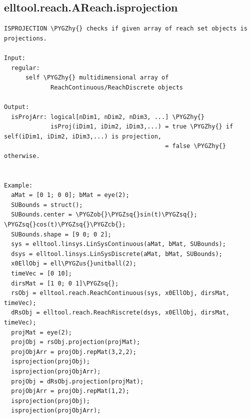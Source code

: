 \documentclass[letterpaper,10pt,english]{sphinxmanual}
\def\PYGZus{\char`\_}
\def\PYGZob{\char`\{}
\def\PYGZcb{\char`\}}
\def\PYGZhy{\char`\-}
\def\PYGZsq{\char`\'}
\begin{document}
\subsection{elltool.reach.AReach.isprojection}
\label{chap_functions:elltool-reach-areach-isprojection}
\begin{Verbatim}[commandchars=\\\{\}]
ISPROJECTION \PYGZhy{} checks if given array of reach set objects is projections.

Input:
  regular:
      self \PYGZhy{} multidimensional array of
             ReachContinuous/ReachDiscrete objects

Output:
  isProjArr: logical[nDim1, nDim2, nDim3, ...] \PYGZhy{}
             isProj(iDim1, iDim2, iDim3,...) = true \PYGZhy{} if self(iDim1, iDim2, iDim3,...) is projection,
                                             = false \PYGZhy{} otherwise.


Example:
  aMat = [0 1; 0 0]; bMat = eye(2);
  SUBounds = struct();
  SUBounds.center = \PYGZob{}\PYGZsq{}sin(t)\PYGZsq{}; \PYGZsq{}cos(t)\PYGZsq{}\PYGZcb{};
  SUBounds.shape = [9 0; 0 2];
  sys = elltool.linsys.LinSysContinuous(aMat, bMat, SUBounds);
  dsys = elltool.linsys.LinSysDiscrete(aMat, bMat, SUBounds);
  x0EllObj = ell\PYGZus{}unitball(2);
  timeVec = [0 10];
  dirsMat = [1 0; 0 1]\PYGZsq{};
  rsObj = elltool.reach.ReachContinuous(sys, x0EllObj, dirsMat, timeVec);
  dRsObj = elltool.reach.ReachRiscrete(dsys, x0EllObj, dirsMat, timeVec);
  projMat = eye(2);
  projObj = rsObj.projection(projMat);
  projObjArr = projObj.repMat(3,2,2);
  isprojection(projObj);
  isprojection(projObjArr);
  projObj = dRsObj.projection(projMat);
  projObjArr = projObj.repMat(1,2);
  isprojection(projObj);
  isprojection(projObjArr);
\end{Verbatim}
\end{document}
